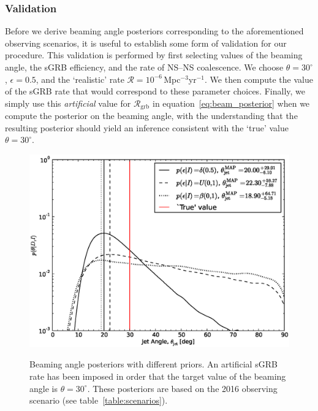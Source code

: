 \documentclass[twocolumn,nofootinbib]{revtex4-1}
\newcommand{\grbrate}{{{\mathcal R}_{\mathrm{grb}}}}
\newcommand{\cbcrate}{{{\mathcal R}}}
\newcommand{\BNS}{\ac{NS}--\ac{NS}\xspace}
\begin{document}
\subsubsection{Validation}
Before we derive beaming angle posteriors corresponding to the aforementioned observing scenarios, it is useful to establish some form of validation for our procedure.
This validation is performed by first selecting values of the beaming angle, the \ac{sGRB} efficiency, and the rate of \BNS coalescence.
We choose $\theta=30^{\circ}$, $\epsilon=0.5$, and the `realistic' rate $\cbcrate = 10^{-6}$\,Mpc$^{-3}$yr$^{-1}$.
We then compute the value of the \ac{sGRB} rate that would correspond to these parameter choices.
Finally, we simply use this \emph{artificial} value for $\grbrate$ in equation~\ref{eq:beam_posterior} when we compute the posterior on the beaming angle, with the understanding that the resulting posterior should yield an inference consistent with the `true' value $\theta=30^{\circ}$.
%
\begin{figure}%
\centering
{\includegraphics[width=\linewidth]{jet_angle_posterior_aligo_2016.eps}}
\caption{Beaming angle posteriors with different priors.
    An artificial \ac{sGRB} rate has been imposed in order that the target value of the beaming angle is $\theta = 30^{\circ}$.
    These posteriors are based on the 2016 observing scenario (see table~\ref{table:scenarios}).
    \label{fig:injjetposterio2016}}
\end{figure}
%
\end{document}
